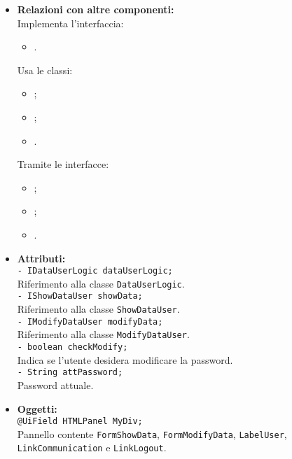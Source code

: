 {\begin{sloppypar}
{{\begin{itemize}
			\item[] \textbf{Relazioni con altre componenti:}\\
				Implementa l'interfaccia:
				\begin{itemize}
					\item[] . 
				\end{itemize}
				Usa le classi:
				\begin{itemize}
					\item[] ;
					\item[] ;
					\item[] .
				\end{itemize}
				Tramite le interfacce:
				\begin{itemize}
					\item[] ;
					\item[] ;
					\item[] .\\
				\end{itemize}

			\item[] \textbf{Attributi:}\\
				\texttt{- IDataUserLogic dataUserLogic;}\\
				Riferimento alla classe \texttt{DataUserLogic}.\\
				
				\texttt{- IShowDataUser showData;}\\
				Riferimento alla classe \texttt{ShowDataUser}.\\
				
				\texttt{- IModifyDataUser modifyData;}\\
				Riferimento alla classe \texttt{ModifyDataUser}.\\
				
				\texttt{- boolean checkModify;}\\
				Indica se l'utente desidera modificare la password.\\
				
				\texttt{- String attPassword;}\\
				Password attuale.\\

			\item[] \textbf{Oggetti:}\\
				\texttt{@UiField HTMLPanel MyDiv;}\\
				Pannello contente \texttt{FormShowData}, \texttt{FormModifyData}, \texttt{LabelUser}, \texttt{LinkCommunication} e \texttt{LinkLogout}.\\
				

\end{itemize}}}
\end{sloppypar}}
